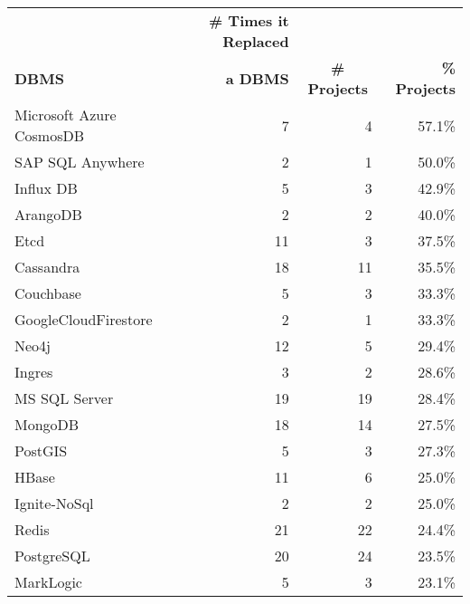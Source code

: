 \begin{tabular}{lrrr}
\hline
\multicolumn{1}{l}{\textbf{}} & \multicolumn{1}{r}{\textbf{\# Times it Replaced}} & \multicolumn{1}{c}{\textbf{}} & \textbf{} \\
\multicolumn{1}{l}{\textbf{DBMS}} & \multicolumn{1}{r}{\textbf{ a DBMS}} & \multicolumn{1}{c}{\textbf{\# Projects}} & \textbf{\% Projects} \\
\hline
Microsoft Azure CosmosDB &                           7 &           4 &       57.1\% \\
        SAP SQL Anywhere &                           2 &           1 &       50.0\% \\
               Influx DB &                           5 &           3 &       42.9\% \\
                ArangoDB &                           2 &           2 &       40.0\% \\
                    Etcd &                          11 &           3 &       37.5\% \\
               Cassandra &                          18 &          11 &       35.5\% \\
               Couchbase &                           5 &           3 &       33.3\% \\
    GoogleCloudFirestore &                           2 &           1 &       33.3\% \\
                   Neo4j &                          12 &           5 &       29.4\% \\
                  Ingres &                           3 &           2 &       28.6\% \\
           MS SQL Server &                          19 &          19 &       28.4\% \\
                 MongoDB &                          18 &          14 &       27.5\% \\
                 PostGIS &                           5 &           3 &       27.3\% \\
                   HBase &                          11 &           6 &       25.0\% \\
            Ignite-NoSql &                           2 &           2 &       25.0\% \\
                   Redis &                          21 &          22 &       24.4\% \\
              PostgreSQL &                          20 &          24 &       23.5\% \\
               MarkLogic &                           5 &           3 &       23.1\% \\

\end{tabular}
